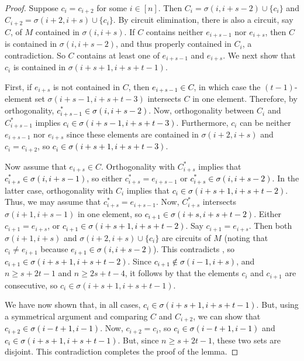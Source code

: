 \documentclass[11pt]{amsart}
\newcommand{\bloo}{\textcolor{black}}
\begin{document}
\begin{proof}
Suppose $c_i = c_{i+2}$ for some $i\in [n]$. Then $C_i = \sigma(i, i+s-2) \cup \{c_i\}$ and $C_{i+2} = \sigma(i+2, i+s) \cup \{c_i\}$. By circuit elimination, there is also a circuit, say $C$, of $M$ contained in $\sigma(i, i+s)$. If $C$ contains neither $e_{i+s-1}$ nor $e_{i+s}$, then $C$ is contained in $\sigma(i, i+s-2)$, and thus properly contained in $C_i$, a contradiction. So $C$ contains at least one of $e_{i+s-1}$ and $e_{i+s}$. We next show that $c_i$ is contained in $\sigma(i+s+1, i+s+t-1)$.

First, if $e_{i+s}$ is not contained in $C$, then \bloo{$e_{i+s-1} \in C$}, in which case the $(t-1)$-element set $\sigma(i+s-1, i+s+t-3)$ intersects $C$ in one element. Therefore, by orthogonality, \bloo{$c^*_{i+s-1} \in \sigma(i,i+s-2)$}. Now, orthogonality between $C_i$ and $C^*_{i+s-1}$ implies \bloo{$c_i \in \sigma(i+s-1, i+s+t-3)$}. Furthermore, $c_i$ can be neither $e_{i+s-1}$ nor $e_{i+s}$ since these elements are contained in $\sigma\left(i+2, i+s\right)$ and $c_i=c_{i+2}$, so \bloo{$c_i \in \sigma(i+s+1, i+s+t-3)$}.

Now assume that $e_{i+s} \in C$. Orthogonality with $C^*_{i+s}$ implies that \bloo{$\left.c^*_{i+s} \in \sigma(i,i+s-1)\right.$}, so either $c^*_{i+s} = e_{i+s-1}$ or \bloo{$\left.c^*_{i+s} \in \sigma(i, i+s-2)\right.$}. In the latter case, orthogonality with $C_i$ implies that \bloo{$\left.c_i \in \sigma(i+s+1,i+s+t-2)\right.$}. Thus, we may assume that $c^*_{i+s} = e_{i+s-1}$. Now, $C^*_{i+s}$ intersects $\sigma(i+1,i+s-1)$ in one element, so \bloo{$c_{i+1} \in \sigma(i+s,i+s+t-2)$}. Either $c_{i+1} = e_{i+s}$, or \bloo{$c_{i+1} \in \sigma(i+s+1, i+s+t-2)$}. Say $c_{i+1} = e_{i+s}$. Then both $\sigma(i+1, i+s)$ and $\sigma(i+2, i+s)\cup \{c_i\}$ are circuits of $M$ (noting that $c_i \neq e_{i+1}$ because \bloo{$\left.e_{i+1} \in \sigma(i, i+s-2)\right.$}). This contradicts , so \bloo{$c_{i+1} \in \sigma(i+s+1,i+s+t-2)$}. Since \bloo{$c_{i+1}\notin \sigma(i-1, i+s)$}, and $n\ge s+2t-1$ and $n\ge 2s+t-4$, it follows by  that the elements $c_i$ and $c_{i+1}$ are consecutive, so $c_i \in \sigma(i+s+1, i+s+t-1)$.

We have now shown that, in all cases, \bloo{$c_i \in \sigma(i+s+1, i+s+t-1)$}. But, using a symmetrical argument and comparing $C$ and $C_{i+2}$, we can show that \bloo{$c_{i+2} \in \sigma(i-t+1, i-1)$}. Now, $c_{i+2} = c_i$, so \bloo{$c_i \in \sigma(i-t+1, i-1)$} and \bloo{$c_i \in \sigma(i+s+1, i+s+t-1)$}. But, since $n \geq s+2t-1$, these two sets are disjoint. This contradiction completes the proof of the lemma.
\end{proof}
\end{document}
